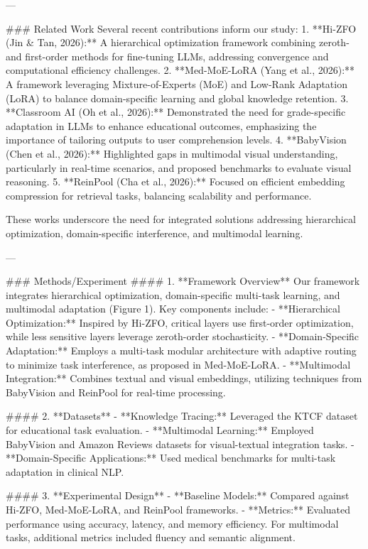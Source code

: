 ---

### Related Work
Several recent contributions inform our study:
1. **Hi-ZFO (Jin & Tan, 2026):** A hierarchical optimization framework combining zeroth- and first-order methods for fine-tuning LLMs, addressing convergence and computational efficiency challenges.
2. **Med-MoE-LoRA (Yang et al., 2026):** A framework leveraging Mixture-of-Experts (MoE) and Low-Rank Adaptation (LoRA) to balance domain-specific learning and global knowledge retention.
3. **Classroom AI (Oh et al., 2026):** Demonstrated the need for grade-specific adaptation in LLMs to enhance educational outcomes, emphasizing the importance of tailoring outputs to user comprehension levels.
4. **BabyVision (Chen et al., 2026):** Highlighted gaps in multimodal visual understanding, particularly in real-time scenarios, and proposed benchmarks to evaluate visual reasoning.
5. **ReinPool (Cha et al., 2026):** Focused on efficient embedding compression for retrieval tasks, balancing scalability and performance.

These works underscore the need for integrated solutions addressing hierarchical optimization, domain-specific interference, and multimodal learning.

---

### Methods/Experiment
#### 1. **Framework Overview**
Our framework integrates hierarchical optimization, domain-specific multi-task learning, and multimodal adaptation (Figure 1). Key components include:
   - **Hierarchical Optimization:** Inspired by Hi-ZFO, critical layers use first-order optimization, while less sensitive layers leverage zeroth-order stochasticity.
   - **Domain-Specific Adaptation:** Employs a multi-task modular architecture with adaptive routing to minimize task interference, as proposed in Med-MoE-LoRA.
   - **Multimodal Integration:** Combines textual and visual embeddings, utilizing techniques from BabyVision and ReinPool for real-time processing.

#### 2. **Datasets**
   - **Knowledge Tracing:** Leveraged the KTCF dataset for educational task evaluation.
   - **Multimodal Learning:** Employed BabyVision and Amazon Reviews datasets for visual-textual integration tasks.
   - **Domain-Specific Applications:** Used medical benchmarks for multi-task adaptation in clinical NLP.

#### 3. **Experimental Design**
   - **Baseline Models:** Compared against Hi-ZFO, Med-MoE-LoRA, and ReinPool frameworks.
   - **Metrics:** Evaluated performance using accuracy, latency, and memory efficiency. For multimodal tasks, additional metrics included fluency and semantic alignment.

